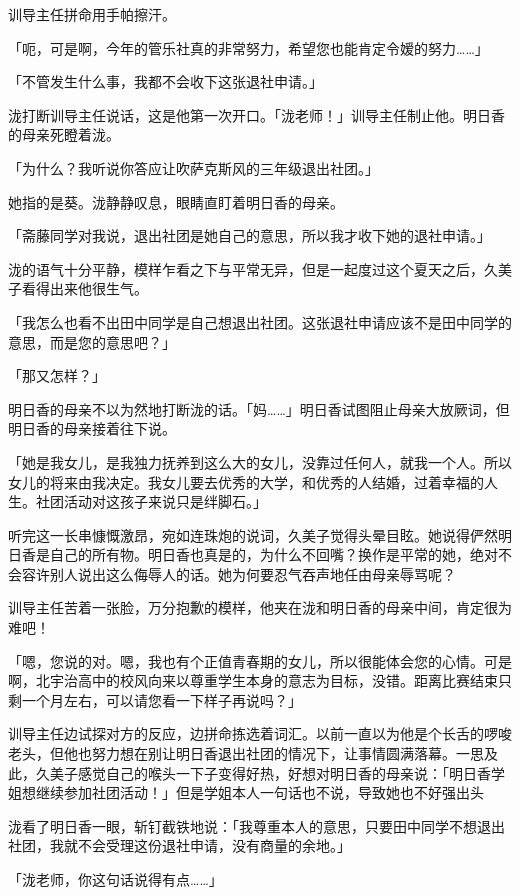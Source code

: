 \documentclass[UTF8]{ctexart}
\begin{document}
    训导主任拼命用手帕擦汗。 

    「呃，可是啊，今年的管乐社真的非常努力，希望您也能肯定令嫒的努力……」 

    「不管发生什么事，我都不会收下这张退社申请。」 

    泷打断训导主任说话，这是他第一次开口。「泷老师！」训导主任制止他。明日香的母亲死瞪着泷。 

    「为什么？我听说你答应让吹萨克斯风的三年级退出社团。」 

    她指的是葵。泷静静叹息，眼睛直盯着明日香的母亲。 

    「斋藤同学对我说，退出社团是她自己的意思，所以我才收下她的退社申请。」 

    泷的语气十分平静，模样乍看之下与平常无异，但是一起度过这个夏天之后，久美子看得出来他很生气。 

    「我怎么也看不出田中同学是自己想退出社团。这张退社申请应该不是田中同学的意思，而是您的意思吧？」 

    「那又怎样？」 

    明日香的母亲不以为然地打断泷的话。「妈……」明日香试图阻止母亲大放厥词，但明日香的母亲接着往下说。 

    「她是我女儿，是我独力抚养到这么大的女儿，没靠过任何人，就我一个人。所以女儿的将来由我决定。我女儿要去优秀的大学，和优秀的人结婚，过着幸福的人生。社团活动对这孩子来说只是绊脚石。」 

    听完这一长串慷慨激昂，宛如连珠炮的说词，久美子觉得头晕目眩。她说得俨然明日香是自己的所有物。明日香也真是的，为什么不回嘴？换作是平常的她，绝对不会容许别人说出这么侮辱人的话。她为何要忍气吞声地任由母亲辱骂呢？ 

    训导主任苦着一张脸，万分抱歉的模样，他夹在泷和明日香的母亲中间，肯定很为难吧！ 

    「嗯，您说的对。嗯，我也有个正值青春期的女儿，所以很能体会您的心情。可是啊，北宇治高中的校风向来以尊重学生本身的意志为目标，没错。距离比赛结束只剩一个月左右，可以请您看一下样子再说吗？」 

    训导主任边试探对方的反应，边拼命拣选着词汇。以前一直以为他是个长舌的啰唆老头，但他也努力想在别让明日香退出社团的情况下，让事情圆满落幕。一思及此，久美子感觉自己的喉头一下子变得好热，好想对明日香的母亲说：「明日香学姐想继续参加社团活动！」但是学姐本人一句话也不说，导致她也不好强出头 

    泷看了明日香一眼，斩钉截铁地说：「我尊重本人的意思，只要田中同学不想退出社团，我就不会受理这份退社申请，没有商量的余地。」 

    「泷老师，你这句话说得有点……」 
\end{document}
